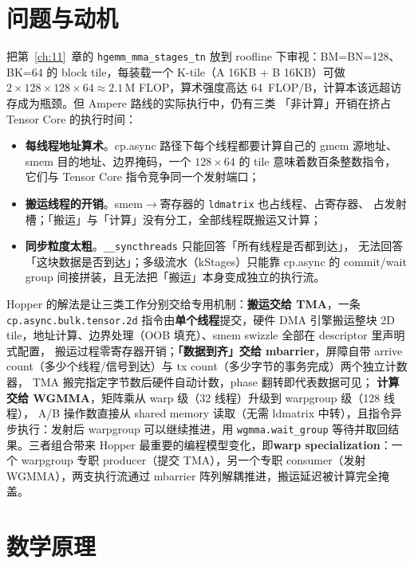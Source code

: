 \section{问题与动机}

把第~\ref{ch:11}~章的 \texttt{hgemm\_\allowbreak{}mma\_\allowbreak{}stages\_\allowbreak{}tn} 放到 roofline 下审视：BM=BN=128、
BK=64 的 block tile，每装载一个 K-tile（A 16KB + B 16KB）可做
$2 \times 128 \times 128 \times 64 \approx 2.1\,\mathrm{M}$ FLOP，算术强度高达
64~FLOP/B，计算本该远超访存成为瓶颈。但 Ampere 路线的实际执行中，仍有三类
「非计算」开销在挤占 Tensor Core 的执行时间：

\begin{itemize}
  \item \textbf{每线程地址算术}。cp.async 路径下每个线程都要计算自己的 gmem 源地址、
        smem 目的地址、边界掩码，一个 $128 \times 64$ 的 tile 意味着数百条整数指令，
        它们与 Tensor Core 指令竞争同一个发射端口；
  \item \textbf{搬运线程的开销}。smem$\to$寄存器的 \texttt{ldmatrix} 也占线程、占寄存器、
        占发射槽；「搬运」与「计算」没有分工，全部线程既搬运又计算；
  \item \textbf{同步粒度太粗}。\texttt{\_\allowbreak{}\_\allowbreak{}syncthreads} 只能回答「所有线程是否都到达」，
        无法回答「这块数据是否到达」；多级流水（kStages）只能靠 cp.async 的
        commit/wait group 间接拼装，且无法把「搬运」本身变成独立的执行流。
\end{itemize}

Hopper 的解法是让三类工作分别交给专用机制：\textbf{搬运交给 TMA}，一条
\texttt{cp.\allowbreak{}async.\allowbreak{}bulk.\allowbreak{}tensor.2d} 指令由\textbf{单个线程}提交，硬件 DMA 引擎搬运整块
2D tile，地址计算、边界处理（OOB 填充）、smem swizzle 全部在 descriptor 里声明式配置，
搬运过程零寄存器开销；\textbf{「数据到齐」交给 mbarrier}，屏障自带
arrive count（多少个线程/信号到达）与 tx count（多少字节的事务完成）两个独立计数器，
TMA 搬完指定字节数后硬件自动计数，phase 翻转即代表数据可见；
\textbf{计算交给 WGMMA}，矩阵乘从 warp 级（32 线程）升级到 warpgroup 级（128 线程），
A/B 操作数直接从 shared memory 读取（无需 ldmatrix 中转），且指令异步执行：发射后
warpgroup 可以继续推进，用 \texttt{wgmma.\allowbreak{}wait\_\allowbreak{}group} 等待并取回结果。三者组合带来 Hopper
最重要的编程模型变化，即\textbf{warp specialization}：一个 warpgroup 专职
producer（提交 TMA），另一个专职 consumer（发射 WGMMA），两支执行流通过 mbarrier
阵列解耦推进，搬运延迟被计算完全掩盖。

\section{数学原理}

